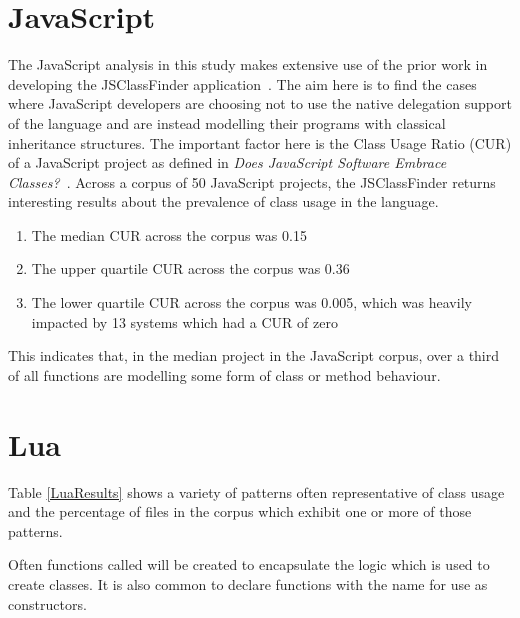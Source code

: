 \section{JavaScript}
The JavaScript analysis in this study makes extensive use of the prior work in developing the JSClassFinder application~\cite{JSClassFinder}. The aim here is to find the cases where JavaScript developers are choosing not to use the native delegation support of the language and are instead modelling their programs with classical inheritance structures. The important factor here is the Class Usage Ratio (CUR) of a JavaScript project as defined in \textit{Does JavaScript Software Embrace Classes?~\cite{JSClassFinder}}. Across a corpus of 50 JavaScript projects, the JSClassFinder returns interesting results about the prevalence of class usage in the language.
\begin{enumerate}
	\item The median CUR across the corpus was 0.15
	\item The upper quartile CUR across the corpus was 0.36
	\item The lower quartile CUR across the corpus was 0.005, which was heavily impacted by 13 systems which had a CUR of zero
\end{enumerate}

This indicates that, in the median project in the JavaScript corpus, over a third of all functions are modelling some form of class or method behaviour.

\section{Lua}
Table \ref{LuaResults} shows a variety of patterns often representative of class usage and the percentage of files in the corpus which exhibit one or more of those patterns.\newline

Often functions called  will be created to encapsulate the  logic which is used to create classes. It is also common to declare functions with the name  for use as constructors.

